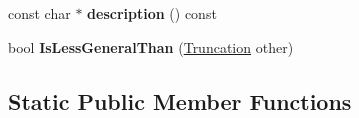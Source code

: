 \begin{DoxyCompactItemize}
\item 
const char $\ast$ {\bfseries description} () const \hypertarget{classv8_1_1internal_1_1compiler_1_1_truncation_a550313a9d3f0276dc5f87ef4aed801a0}{}\label{classv8_1_1internal_1_1compiler_1_1_truncation_a550313a9d3f0276dc5f87ef4aed801a0}

\item 
bool {\bfseries Is\+Less\+General\+Than} (\hyperlink{classv8_1_1internal_1_1compiler_1_1_truncation}{Truncation} other)\hypertarget{classv8_1_1internal_1_1compiler_1_1_truncation_a65c040790b9526c2667136216b0b84b5}{}\label{classv8_1_1internal_1_1compiler_1_1_truncation_a65c040790b9526c2667136216b0b84b5}

\end{DoxyCompactItemize}
\subsection*{Static Public Member Functions}
